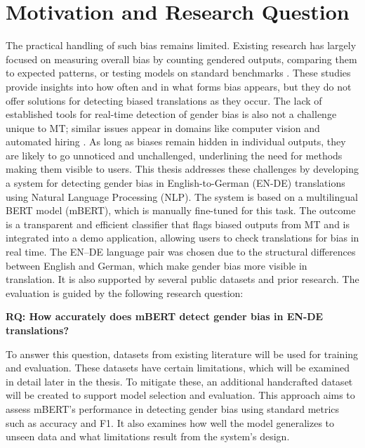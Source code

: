 \section{Motivation and Research Question}
    The practical handling of such bias remains limited. Existing research has largely focused on measuring overall bias by counting gendered outputs, comparing them to expected patterns, or testing models on standard benchmarks \parencite{rescignoGenderBiasMachine2023,barclayInvestigatingMarkersDrivers2024a,pratesAssessingGenderBias2019,savoldiWhatHarmQuantifying2024}. These studies provide insights into how often and in what forms bias appears, but they do not offer solutions for detecting biased translations as they occur. The lack of established tools for real-time detection of gender bias is also not a challenge unique to MT; similar issues appear in domains like computer vision and automated hiring \parencite{schwemmerDiagnosingGenderBias2020}. As long as biases remain hidden in individual outputs, they are likely to go unnoticed and unchallenged, underlining the need for methods making them visible to users. This thesis addresses these challenges by developing a system for detecting gender bias in English-to-German (EN-DE) translations using Natural Language Processing (NLP). The system is based on a multilingual BERT model (mBERT), which is manually fine-tuned for this task. The outcome is a transparent and efficient classifier that flags biased outputs from MT and is integrated into a demo application, allowing users to check translations for bias in real time. The EN–DE language pair was chosen due to the structural differences between English and German, which make gender bias more visible in translation. It is also supported by several public datasets and prior research. The evaluation is guided by the following research question:

    \vspace{0.8em}
    \noindent \textbf{RQ: How accurately does mBERT detect gender bias in EN-DE translations?}

    \vspace{0.8em}

    \noindent To answer this question, datasets from existing literature will be used for training and evaluation. These datasets have certain limitations, which will be examined in detail later in the thesis. To mitigate these, an additional handcrafted dataset will be created to support model selection and evaluation. This approach aims to assess mBERT's performance in detecting gender bias using standard metrics such as accuracy and F1. It also examines how well the model generalizes to unseen data and what limitations result from the system's design.

